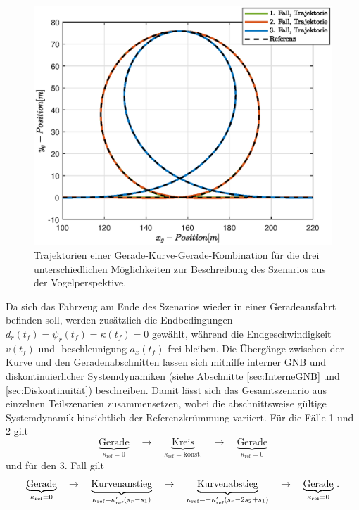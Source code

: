 \begin{figure}[h] 
	\centering
	\includegraphics[width=0.7\linewidth]{./Bilder/Ergebnisse/Gerade_Kurve_Gerade/gerade_kurve_gerade_xy_pos.eps}
	\caption{Trajektorien einer Gerade-Kurve-Gerade-Kombination für die drei unterschiedlichen Möglichkeiten zur Beschreibung des Szenarios aus der Vogelperspektive.}
	\label{fig:gerade_kurve_gerade_xy_pos}
\end{figure} 
Da sich das Fahrzeug am Ende des Szenarios wieder in einer Geradeausfahrt befinden soll, werden zusätzlich die Endbedingungen $d_r(t_f) = \psi_r(t_f) = \kappa(t_f) = 0$ gewählt, während die Endgeschwindigkeit $v(t_f)$ und -beschleunigung $a_x(t_f)$ frei bleiben. Die Übergänge zwischen der Kurve und den Geradenabschnitten lassen sich mithilfe interner \gls{GNB} und diskontinuierlicher Systemdynamiken (siehe Abschnitte \ref{sec:InterneGNB} und \ref{sec:Diskontinuität}) beschreiben. Damit lässt sich das Gesamtszenario aus einzelnen Teilszenarien zusammensetzen, wobei die abschnittsweise gültige Systemdynamik hinsichtlich der Referenzkrümmung variiert. Für die Fälle 1 und 2 gilt 
\begin{equation}
\underbrace{\textrm{Gerade}}_{\kappa_{\textrm{ref}} = 0} \quad \rightarrow \quad \underbrace{\textrm{Kreis}}_{\kappa_{\textrm{ref}} = \textrm{konst.}} \quad \rightarrow \quad \underbrace{\textrm{Gerade}}_{\kappa_{\textrm{ref}} = 0} 
\end{equation}
und für den 3. Fall gilt 
\begin{equation}
\underbrace{\textrm{Gerade}}_{\kappa_{\textrm{ref}} = 0} \quad \rightarrow \quad \underbrace{\textrm{Kurvenanstieg}}_{\kappa_{\textrm{ref}} = \kappa'_{\textrm{ref}} (s_r-s_1)} \quad \rightarrow \quad \underbrace{\textrm{Kurvenabstieg}}_{\kappa_{\textrm{ref}} = -\kappa'_{\textrm{ref}} (s_r-2s_2+s_1)} \quad \rightarrow \quad \underbrace{\textrm{Gerade}}_{\kappa_{\textrm{ref}} = 0} \,.
\end{equation}
